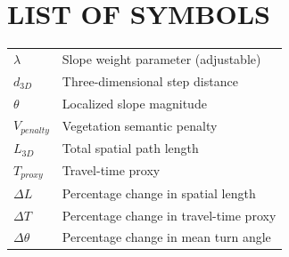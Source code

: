 \chapter{LIST OF SYMBOLS}

\onehalfspacing
\noindent
\begin{tabular}{p{3.0cm}p{10.0cm}}
$\lambda$ & Slope weight parameter (adjustable)\\
$d_{3D}$ & Three-dimensional step distance\\
$\theta$ & Localized slope magnitude\\
$V_{penalty}$ & Vegetation semantic penalty\\
$L_{3D}$ & Total spatial path length\\
$T_{proxy}$ & Travel-time proxy\\
$\Delta L$ & Percentage change in spatial length\\
$\Delta T$ & Percentage change in travel-time proxy\\
$\Delta \theta$ & Percentage change in mean turn angle\\
\end{tabular}